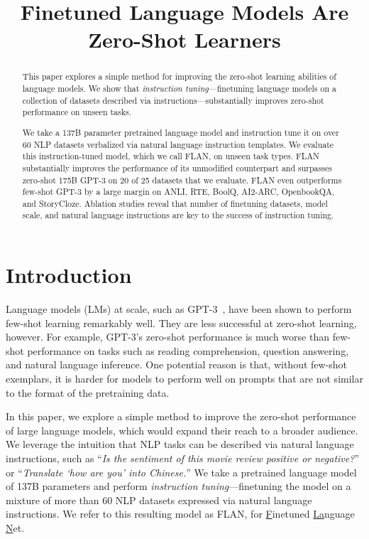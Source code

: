\title{Finetuned Language Models Are Zero-Shot Learners}

\begin{abstract}
This paper explores a simple method for improving the zero-shot learning abilities of language models. We show that \textit{instruction tuning}---finetuning language models on a collection of datasets described via instructions---substantially improves zero-shot performance on unseen tasks.

We take a 137B parameter pretrained language model and instruction tune it on over 60 NLP datasets verbalized via natural language instruction templates. We evaluate this instruction-tuned model, which we call FLAN, on unseen task types. FLAN substantially improves the performance of its unmodified counterpart and surpasses zero-shot 175B GPT-3 on 20 of 25 datasets that we evaluate. FLAN even outperforms few-shot GPT-3 by a large margin on ANLI, RTE, BoolQ, AI2-ARC, OpenbookQA, and StoryCloze. Ablation studies reveal that number of finetuning datasets, model scale, and natural language instructions are key to the success of instruction tuning.
\end{abstract}

\section{Introduction}

Language models (LMs) at scale, such as GPT-3~\citep{brown2020language}, have been shown to perform few-shot learning remarkably well. They are less successful at zero-shot learning, however. For example, GPT-3's zero-shot performance is much worse than few-shot performance on tasks such as reading comprehension, question answering, and natural language inference. One potential reason is that, without few-shot exemplars, it is harder for models to perform well on prompts that are not similar to the format of the pretraining data.

In this paper, we explore a simple method to improve the zero-shot performance of large language models, which would expand their reach to a broader audience. We leverage the intuition that NLP tasks can be described via natural language instructions, such as ``\textit{Is the sentiment of this movie review positive or negative?}'' or ``\textit{Translate `how are you' into Chinese.}'' We take a pretrained language model of 137B parameters and perform \textit{instruction tuning}---finetuning the model on a mixture of more than 60 NLP datasets expressed via natural language instructions. We refer to this resulting model as FLAN, for \underline{F}inetuned \underline{La}nguage \underline{N}et.

